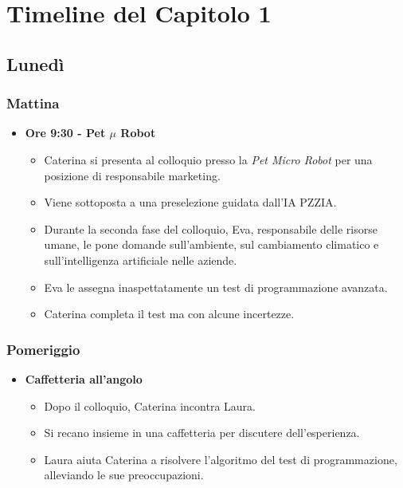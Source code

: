 
\section*{Timeline del Capitolo 1}

\subsection*{Lunedì}

\subsubsection*{Mattina}

\begin{itemize}
    \item \textbf{Ore 9:30 - Pet $\mu$ Robot}
    \begin{itemize}
        \item Caterina si presenta al colloquio presso la \emph{Pet Micro Robot} per una posizione di responsabile marketing.
        \item Viene sottoposta a una preselezione guidata dall'IA PZZIA.
        \item Durante la seconda fase del colloquio, Eva, responsabile delle risorse umane, le pone domande sull'ambiente, sul cambiamento climatico e sull'intelligenza artificiale nelle aziende.
        \item Eva le assegna inaspettatamente un test di programmazione avanzata.
        \item Caterina completa il test ma con alcune incertezze.
    \end{itemize}
\end{itemize}

\subsubsection*{Pomeriggio}

\begin{itemize}
    \item \textbf{Caffetteria all'angolo}
    \begin{itemize}
        \item Dopo il colloquio, Caterina incontra Laura.
        \item Si recano insieme in una caffetteria per discutere dell'esperienza.
        \item Laura aiuta Caterina a risolvere l'algoritmo del test di programmazione, alleviando le sue preoccupazioni.
    \end{itemize}
\end{itemize}

